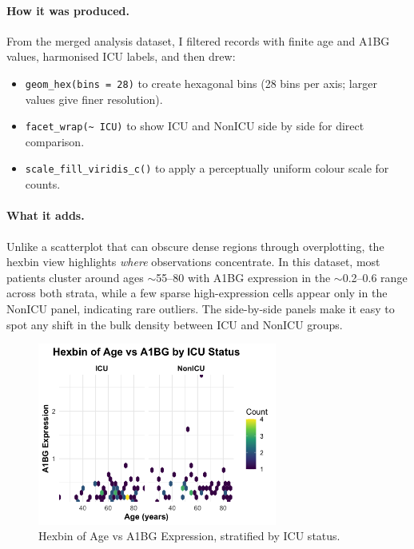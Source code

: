 \documentclass[11pt]{article}
\begin{document}
\paragraph{How it was produced.}
From the merged analysis dataset, I filtered records with finite age and A1BG values, harmonised ICU labels, and then drew:
\begin{itemize}
  \item \texttt{geom\_hex(bins = 28)} to create hexagonal bins (28 bins per axis; larger values give finer resolution).
  \item \texttt{facet\_wrap(\textasciitilde{} ICU)} to show ICU and NonICU side by side for direct comparison.
  \item \texttt{scale\_fill\_viridis\_c()} to apply a perceptually uniform colour scale for counts.
\end{itemize}

\paragraph{What it adds.}
Unlike a scatterplot that can obscure dense regions through overplotting, the hexbin view highlights \emph{where} observations concentrate. In this dataset, most patients cluster around ages $\sim$55--80 with A1BG expression in the $\sim$0.2--0.6 range across both strata, while a few sparse high-expression cells appear only in the NonICU panel, indicating rare outliers. The side-by-side panels make it easy to spot any shift in the bulk density between ICU and NonICU groups.

\begin{figure}[H]
\centering
\includegraphics[width=0.7\textwidth]{fig5_hex.png}
\caption{Hexbin of Age vs A1BG Expression, stratified by ICU status.}
\label{fig:hex}
\end{figure}
\end{document}
